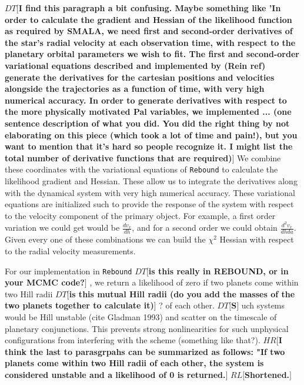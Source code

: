 \documentclass{aa}
\def\memohr#1{\color{blue}$HR[${\bf #1}$]$ \color{black}}
\def\memodt#1{\color{green}$DT[${\bf #1}$]$ \color{black}}
\def\memorl#1{\color{gray}$RL[${\bf #1}$]$ \color{black}}
\begin{document}
\memodt{I find this paragraph a bit confusing. Maybe something like 'In order to calculate the gradient and Hessian of the likelihood function as required by SMALA, we need first and second-order derivatives of the star's radial velocity at each observation time, with respect to the planetary orbital parameters we wish to fit.  The first and second-order variational equations described and implemented by (Rein ref) generate the derivatives for the cartesian positions and velocities alongside the trajectories as a function of time, with very high numerical accuracy. In order to generate derivatives with respect to the more physically motivated Pal variables, we implemented ... (one sentence description of what you did. You did the right thing by not elaborating on this piece (which took a lot of time and pain!), but you want to mention that it's hard so people recognize it. I might list the total number of derivative functions that are required)}
We combine these coordinates with the variational equations of \texttt{Rebound} to calculate the likelihood gradient and Hessian. 
These allow us to integrate the derivatives along with the dynamical system with very high numerical accuracy. 
These variational equations are initialized such to provide the response of the system with respect to the velocity component of the primary object. 
For example, a first order variation we could get would be $\frac{dv_x}{dh}$, and for a second order we could obtain $\frac{d^2v_x}{dhda}$. 
Given every one of these combinations we can build the $\chi^2$ Hessian with respect to the radial velocity measurements.

For our implementation in \texttt{Rebound} \memodt{is this really in REBOUND, or in your MCMC code?}, we return a likelihood of zero if two planets come within two Hill radii \memodt{is this mutual Hill radii (do you add the masses of the two planets together to calculate it)}? of each other. 
{\memodt Such systems would be Hill unstable (cite Gladman 1993) and scatter on the timescale of planetary conjunctions. This prevents strong nonlinearities for such unphysical configurations from interfering with the scheme (something like that?).}
\memohr{I think the last to parasgrpahs can be summarized as follows: "If two planets come within two Hill radii of each other, the system is considered unstable and a likelihood of 0 is returned.}
\memorl{Shortened.}
\end{document}
